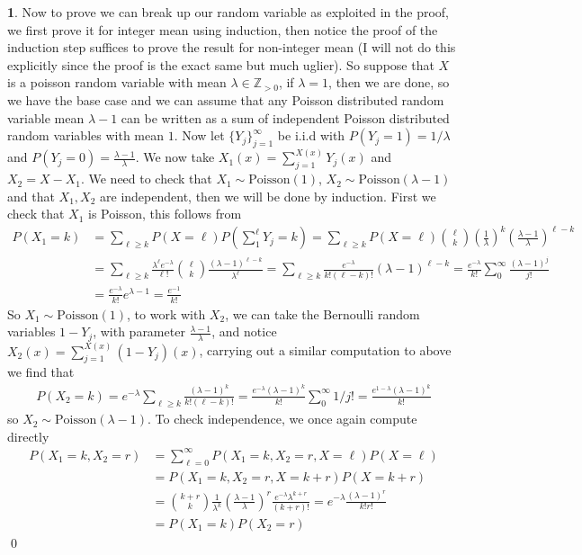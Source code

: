 \documentclass[10.5pt]{article}
\theoremstyle{definition}
\newtheorem{pb}{}
\newcommand{\set}[1]{\{#1\}}
\begin{document}
\begin{pb}
        Now to prove we can break up our random variable as exploited in the proof, we first prove it for integer mean using induction, then notice the proof of the induction step suffices to prove the result for non-integer mean (I will not do this explicitly since the proof is the exact same but much uglier). So suppose that \(X\) is a poisson random variable with mean \(\lambda \in \mathbb{Z}_{>0}\), if \(\lambda = 1\), then we are done, so we have the base case and we can assume that any Poisson distributed random variable mean \(\lambda - 1\) can be written as a sum of independent Poisson distributed random variables with mean \(1\). Now let \(\set{Y_j}_{j=1}^\infty\) be i.i.d with \(P(Y_j = 1) = 1/\lambda\) and \(P(Y_j = 0) = \frac{\lambda - 1}{\lambda}\). We now take \(X_1(x) = \sum_{j=1}^{X(x)} Y_j(x)\) and \(X_2 = X - X_1\). We need to check that \(X_1 \sim \text{Poisson}(1)\), \(X_2 \sim \text{Poisson}(\lambda-1)\) and that \(X_1,X_2\) are independent, then we will be done by induction. First we check that \(X_1\) is Poisson, this follows from
        \begin{align*}
            P(X_1 = k) &= \sum_{\ell \geq k} P(X = \ell)P\left(\sum_1^\ell Y_j = k\right) = \sum_{\ell \geq k} P(X = \ell)\binom{\ell}{k}\left(\frac{1}{\lambda}\right)^k\left(\frac{\lambda - 1}{\lambda}\right)^{\ell - k} \\
            &= \sum_{\ell \geq k} \frac{\lambda^\ell e^{-\lambda}}{\ell!}\binom{\ell}{k}\frac{(\lambda-1)^{\ell-k}}{\lambda^\ell} = \sum_{\ell \geq k} \frac{e^{-\lambda}}{k!(\ell-k)!}(\lambda-1)^{\ell - k} = \frac{e^{-\lambda}}{k!}\sum_0^\infty \frac{(\lambda - 1)^j}{j!} \\
            &= \frac{e^{-\lambda}}{k!} e^{\lambda - 1} = \frac{e^{-1}}{k!}
        \end{align*}
        So \(X_1 \sim \text{Poisson}(1)\), to work with \(X_2\), we can take the Bernoulli random variables \(1 - Y_j\), with parameter \(\frac{\lambda - 1}{\lambda}\), and notice \(X_2(x) = \sum_{j=1}^{X(x)} (1 - Y_j)(x)\), carrying out a similar computation to above we find that
        \begin{align*}
            P(X_2 = k) = e^{-\lambda}\sum_{\ell \geq k}\frac{(\lambda - 1)^k}{k!(\ell-k)!} = \frac{e^{-\lambda}(\lambda-1)^k}{k!}\sum_0^\infty 1/j! = \frac{e^{1-\lambda}(\lambda-1)^k}{k!}
        \end{align*}
        so \(X_2 \sim \text{Poisson}(\lambda - 1)\). To check independence, we once again compute directly
        \begin{align*}
            P(X_1 = k, X_2 = r) &= \sum_{\ell = 0}^\infty P(X_1 = k, X_2 = r, X = \ell)P(X = \ell) \\
            &= P(X_1 = k, X_2 = r, X = k+r)P(X = k + r) \\
            &= \binom{k+r}{k}\frac{1}{\lambda^k}\left(\frac{\lambda - 1}{\lambda}\right)^r \frac{e^{-\lambda}\lambda^{k+r}}{(k+r)!} = e^{-\lambda}\frac{(\lambda-1)^r}{k!r!} \\
            &= P(X_1 = k)P(X_2 = r)
        \end{align*} \qed
    \end{pb}
\end{document}
